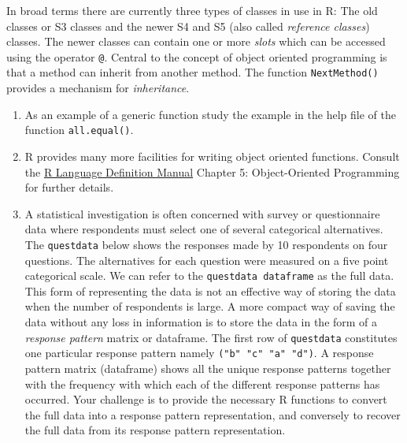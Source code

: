 \documentclass[
]{book}
\begin{document}
In broad terms there are currently three types of classes in use in R: The old classes or S3 classes and the newer S4 and S5 (also called \emph{{reference classes}}) classes. The newer classes can contain one or more \emph{{slots}} which can be accessed using the operator \texttt{@}. Central to the concept of object oriented programming is that a method can inherit from another method. The function \texttt{NextMethod()} provides a mechanism for \emph{{inheritance}}.

\begin{enumerate}
\def\labelenumi{(\alph{enumi})}
\item
  As an example of a generic function study the example in the help file of the function \texttt{all.equal()}.
\item
  R provides many more facilities for writing object oriented functions. Consult the \href{https://cran.r-project.org/doc/manuals/r-release/R-lang.pdf}{R Language Definition Manual} Chapter 5: Object-Oriented Programming for further details.
\item
  A statistical investigation is often concerned with survey or questionnaire data where respondents must select one of several categorical alternatives. The \texttt{questdata} below shows the responses made by 10 respondents on four questions. The alternatives for each question were measured on a five point categorical scale. We can refer to the \texttt{questdata\ dataframe} as the full data. This form of representing the data is not an effective way of storing the data when the number of respondents is large. A more compact way of saving the data without any loss in information is to store the data in the form of a \emph{{response pattern}} matrix or dataframe. The first row of \texttt{questdata} constitutes one particular response pattern namely \texttt{("b"\ "c"\ "a"\ "d")}. A response pattern matrix (dataframe) shows all the unique response patterns together with the frequency with which each of the different response patterns has occurred. Your challenge is to provide the necessary R functions to convert the full data into a response pattern representation, and conversely to recover the full data from its response pattern representation.
\end{enumerate}
\end{document}
